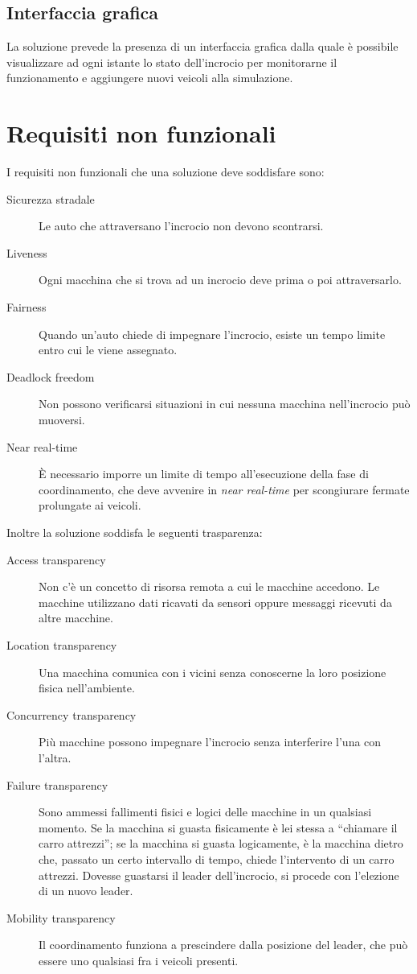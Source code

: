 \documentclass{memoir}
\begin{document}
\subsection{Interfaccia grafica}

La soluzione prevede la presenza di un interfaccia grafica dalla quale è
possibile visualizzare ad ogni istante lo stato dell'incrocio per monitorarne il
funzionamento e aggiungere nuovi veicoli alla simulazione.


\section{Requisiti non funzionali}
I requisiti non funzionali che una soluzione deve soddisfare sono:
\begin{description}
\item[Sicurezza stradale] Le auto che attraversano l'incrocio non devono
  scontrarsi.
\item[Liveness] Ogni macchina che si trova ad un incrocio deve prima o poi
  attraversarlo.
\item[Fairness] Quando un'auto chiede di impegnare l'incrocio, esiste un tempo
  limite entro cui le viene assegnato.
\item[Deadlock freedom] Non possono verificarsi situazioni in cui nessuna
  macchina nell'incrocio può muoversi.
\item[Near real-time] È necessario imporre un limite di tempo all'esecuzione
  della fase di coordinamento, che deve avvenire in \emph{near real-time} per
  scongiurare fermate prolungate ai veicoli.
\end{description}

Inoltre la soluzione soddisfa le seguenti trasparenza:
\begin{description}
\item[Access transparency] Non c'è un concetto di risorsa remota a cui le
  macchine accedono. Le macchine utilizzano dati ricavati da sensori oppure
  messaggi ricevuti da altre macchine.
\item[Location transparency] Una macchina comunica con i vicini senza conoscerne
  la loro posizione fisica nell'ambiente.
\item[Concurrency transparency] Più macchine possono impegnare l'incrocio senza
  interferire l'una con l'altra.
\item[Failure transparency] Sono ammessi fallimenti fisici e logici delle
  macchine in un qualsiasi momento. Se la macchina si guasta fisicamente è lei
  stessa a ``chiamare il carro attrezzi''; se la macchina si guasta logicamente,
  è la macchina dietro che, passato un certo intervallo di tempo, chiede
  l'intervento di un carro attrezzi. Dovesse guastarsi il leader dell'incrocio,
  si procede con l'elezione di un nuovo leader.
\item[Mobility transparency] Il coordinamento funziona a prescindere dalla
  posizione del leader, che può essere uno qualsiasi fra i veicoli presenti.
\end{description}
\end{document}
